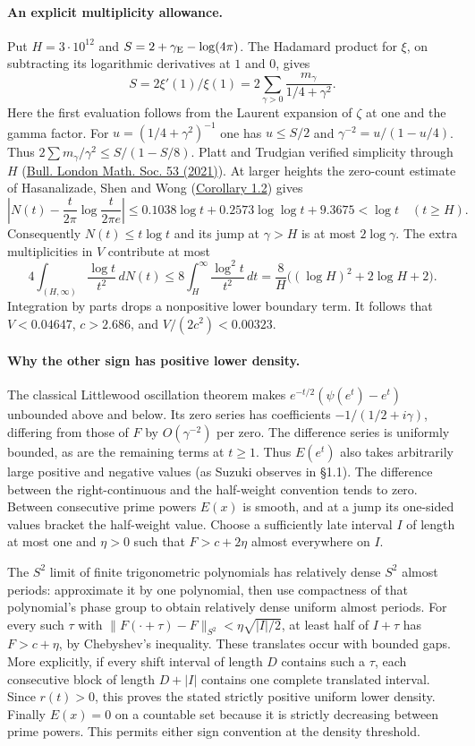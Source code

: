 \paragraph{An explicit multiplicity allowance.}
Put $H=3\cdot10^{12}$ and $S=2+\gamma_{\rm E}-\log(4\pi)$.
The Hadamard product for $\xi$, on subtracting its logarithmic derivatives at
$1$ and $0$, gives
\[
 S=2\xi'(1)/\xi(1)=2\sum_{\gamma>0}\frac{m_\gamma}{1/4+\gamma^2}.
\]
Here the first evaluation follows from the Laurent expansion of $\zeta$ at
one and the gamma factor. For $u=(1/4+\gamma^2)^{-1}$ one has $u\le S/2$
and $\gamma^{-2}=u/(1-u/4)$. Thus
$2\sum m_\gamma/\gamma^2\le S/(1-S/8)$.
Platt and Trudgian verified simplicity through $H$
(\href{https://doi.org/10.1112/blms.12460}{Bull. London Math. Soc. 53 (2021)}).
At larger heights the zero-count estimate of Hasanalizade, Shen and Wong
(\href{https://arxiv.org/abs/2107.06506}{Corollary 1.2}) gives
\[
 \left|N(t)-\frac{t}{2\pi}\log\frac{t}{2\pi e}\right|
 \le 0.1038\log t+0.2573\log\log t+9.3675 <\log t \quad(t\ge H).
\]
Consequently $N(t)\le t\log t$ and its jump at $\gamma>H$ is at most
$2\log\gamma$. The extra multiplicities in $V$ contribute at most
\[
 4\int_{(H,\infty)}\frac{\log t}{t^2}\,dN(t)
 \le 8\int_H^\infty \frac{\log^2t}{t^2}\,dt
 =\frac{8}{H}\big((\log H)^2+2\log H+2\big).
\]
Integration by parts drops a nonpositive lower boundary term.
It follows that $V<0.04647$, $c>2.686$, and $V/(2c^2)<0.00323$.

\paragraph{Why the other sign has positive lower density.}
The classical Littlewood oscillation theorem makes
$e^{-t/2}(\psi(e^t)-e^t)$ unbounded above and below. Its zero series
has coefficients $-1/(1/2+i\gamma)$, differing from those of $F$ by
$O(\gamma^{-2})$ per zero. The difference series is uniformly bounded,
as are the remaining terms at $t\ge1$. Thus $E(e^t)$ also takes arbitrarily
large positive and negative values (as Suzuki observes in \S1.1).
The difference between the right-continuous and the half-weight convention
tends to zero. Between consecutive prime powers $E(x)$ is smooth, and at
a jump its one-sided values bracket the half-weight value.
Choose a sufficiently late interval $I$ of length at most one and
$\eta>0$ such that $F>c+2\eta$ almost everywhere on $I$.

The $S^2$ limit of finite trigonometric polynomials has relatively dense
$S^2$ almost periods: approximate it by one polynomial, then use compactness
of that polynomial's phase group to obtain relatively dense uniform almost
periods. For every such $\tau$ with
$\|F(\cdot+\tau)-F\|_{S^2}<\eta\sqrt{|I|/2}$, at least half of $I+\tau$
has $F>c+\eta$, by Chebyshev's inequality. These translates occur with
bounded gaps. More explicitly, if every shift interval of length $D$ contains
such a $\tau$, each consecutive block of length $D+|I|$ contains one
complete translated interval. Since $r(t)>0$, this proves the stated
strictly positive uniform lower density. Finally $E(x)=0$ on a countable
set because it is strictly decreasing between prime powers. This permits
either sign convention at the density threshold.
